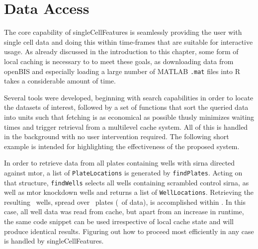 \section{Data Access}
\label{sec:data-access}
The core capability of singleCellFeatures is seamlessly providing the user with single cell data and doing this within time-frames that are suitable for interactive usage. As already discussed in the introduction to this chapter, some form of local caching is necessary to to meet these goals, as downloading data from openBIS and especially loading a large number of MATLAB \texttt{.mat} files into R takes a considerable amount of time.

Several tools were developed, beginning with search capabilities in order to locate the datasets of interest, followed by a set of functions that sort the queried data into units such that fetching is as economical as possible thusly minimizes waiting times and trigger retrieval from a multilevel cache system. All of this is handled in the background with no user intervention required. The following short example is intended for highlighting the effectiveness of the proposed system.



In order to retrieve data from all plates containing wells with \gls{sirna} directed against \gls{mtor}, a list of \texttt{PlateLocations} is generated by \texttt{findPlates}. Acting on that structure, \texttt{findWells} selects all wells containing scrambled control \gls{sirna}, as well as \gls{mtor} knockdown wells and returns a list of \texttt{WellLocations}. Retrieving the resulting \knitrScfFindGetDemoLengthW\ wells, spread over \knitrScfFindGetDemoLengthP\ plates (\knitrScfFindGetDemoSize\ of data), is accomplished within \knitrScfFindGetDemoTime. In this case, all well data was read from cache, but apart from an increase in runtime, the same code snippet can be used irrespective of local cache state and will produce identical results. Figuring out how to proceed most efficiently in any case is handled by singleCellFeatures.

